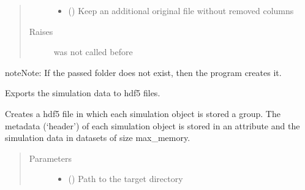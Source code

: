 \documentclass[letterpaper,10pt,english]{sphinxmanual}
\begin{document}
\begin{fulllineitems}
\begin{fulllineitems}
\begin{quote}
\begin{description}
\begin{itemize}
\item {} 
\sphinxAtStartPar
{} (\sphinxstyleliteralemphasis{\sphinxupquote{, }}) \textendash{} Keep an additional original file without removed columns

\end{itemize}

\item[{Raises}] \leavevmode
\sphinxAtStartPar
{} \textendash{}  was not called before

\end{description}\end{quote}

\begin{sphinxadmonition}{note}{Note:}
\sphinxAtStartPar
If the passed folder does not exist, then the program creates it.
\end{sphinxadmonition}

\end{fulllineitems}


\begin{fulllineitems}
\label{\detokenize{source/API/api:environment.Environment.data_to_hdf5}}
\sphinxAtStartPar
Exports the simulation data to hdf5 files.

\sphinxAtStartPar
Creates a hdf5 file in which each simulation object is stored a group. The metadata (‘header’) of each
simulation object is stored in an attribute and the simulation data in datasets of size max\_memory.
\begin{quote}\begin{description}
\item[{Parameters}] \leavevmode\begin{itemize}
\item {} 
\sphinxAtStartPar
{} () \textendash{} Path to the target directory


\end{itemize}
\end{description}
\end{quote}
\end{fulllineitems}
\end{fulllineitems}
\end{document}
